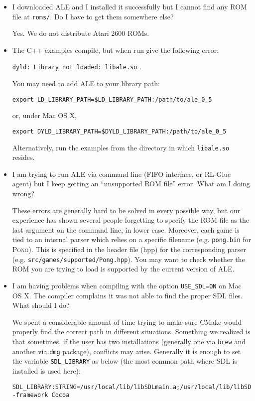 \documentclass[12pt]{article}
\begin{document}
\begin{itemize}
\item I downloaded ALE and I installed it successfully but I cannot find any ROM file at \verb+roms/+.
Do I have to get them somewhere else?

Yes. We do not distribute Atari 2600 ROMs. 

\item The C++ examples compile, but when run give the following error: 
\begin{center}
\verb+dyld: Library not loaded: libale.so+ .
\end{center} 
You may need to add ALE to your library path:

\begin{verbatim}
export LD_LIBRARY_PATH=$LD_LIBRARY_PATH:/path/to/ale_0_5
\end{verbatim}

or, under Mac OS X,

\begin{verbatim}
export DYLD_LIBRARY_PATH=$DYLD_LIBRARY_PATH:/path/to/ale_0_5
\end{verbatim}

Alternatively, run the examples from the directory in which \verb+libale.so+ resides.


\item I am trying to run ALE via command line (FIFO interface, or RL-Glue agent) but I keep 
getting an ``unsupported ROM file'' error. What am I doing wrong?

These errors are generally hard to be solved in every possible way, but our experience has shown 
several people forgetting to specify the ROM file as the last argument on the command line, in lower 
case. Moreover, each game is tied to an internal parser which relies on a specific filename (e.g. \verb+pong.bin+ for \textsc{Pong}). This is specified in the header file (hpp) for the corresponding parser (e.g. \verb+src/games/supported/Pong.hpp+). You may want to check whether the ROM you are 
trying to load is supported by the current version of ALE.

\item I am having problems when compiling with the option \verb+USE_SDL=ON+ on Mac OS X.
The compiler complains it was not able to find the proper SDL files. What should I do?

We spent a considerable amount of time trying to make sure CMake would properly find the correct 
path in different situations. Something we realized is that sometimes, if the user has two 
installations (generally one via \verb+brew+ and another via \verb+dmg+ package), conflicts may 
arise. Generally it is enough to set the variable \verb+SDL_LIBRARY+ as below (the most common
path where SDL is installed is used here):
\vspace{-0.3cm}
\begin{verbatim}
SDL_LIBRARY:STRING=/usr/local/lib/libSDLmain.a;/usr/local/lib/libSDL.dylib;
-framework Cocoa
\end{verbatim}


\end{itemize}
\end{document}
